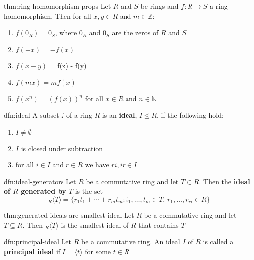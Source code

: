\documentclass[landscape, 8pt]{extarticle}
\begin{document}
\begin{multicols}{3}
\begin{thm}{thm:ring-homomorphism-props}{}
    Let $R$ and $S$ be rings and $f : R \to S$ a ring homomorphism. Then for all $x,y\in R$ and $m\in \mathbb{Z}$:
    \begin{enumerate}
        \setlength\itemsep{0em}
        \item $f(0_{R}) = 0_{S}$, where $0_{R}$ and $0_{S}$ are the zeros of $R$ and $S$
        \item $f(-x) = -f(x)$
        \item $f(x - y)$ = f(x) - f(y)
        \item $f(mx) = mf(x)$
        \item $f(x^{n}) = (f(x))^{n}$ for all $x\in R$ and $n\in \mathbb{N}$
    \end{enumerate}
\end{thm}

\begin{dfn}[Ideal]{dfn:ideal}{}
    A subset $I$ of a ring $R$ is an \textbf{ideal}, $I \unlhd R$, if the following hold:
    \begin{enumerate}
        \setlength\itemsep{0em}
        \item $I \ne \emptyset$
        \item $I$ is closed under subtraction
        \item for all $i\in I$ and $r\in R$ we have $ri, ir\in I$
    \end{enumerate}
\end{dfn}

\newpage
\begin{dfn}{dfn:ideal-generators}{}
    Let $R$ be a commutative ring and let $T \subset R$. Then the \textbf{ideal of $R$ generated by $T$} is the set
    \[{}_{R}\langle T \rangle = \{r_{1}t_{1}+\cdots+r_{m}t_{m} : t_{1},\dots,t_{m}\in T,\,r_{1},\dots,r_{m}\in R\}\]
\end{dfn}

\begin{thm}[]{thm:generated-ideals-are-smallest-ideal}{}
    Let $R$ be a commutative ring and let $T\subseteq R$. Then ${}_{R}\langle T \rangle$ is the smallest ideal of $R$ that contains $T$
\end{thm}

\begin{dfn}{dfn:principal-ideal}{}
    Let $R$ be a commutative ring. An ideal $I$ of $R$ is called a \textbf{principal ideal} if $I = \langle t \rangle$ for some $t\in R$
\end{dfn}


\end{multicols}
\end{document}
